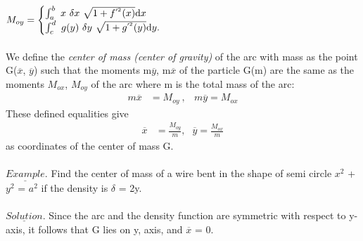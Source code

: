 \documentclass[11pt]{amsbook}
\begin{document}
	\paragraph{}$M_{oy} = \begin{cases} \int_{a}^{b} \ x \ \delta{x} \ \sqrt{1 + f^{'^{2}}(x)}\hDif {x} \\ \int_{c}^{d} \ g(y) \ \delta{y} \ \sqrt{1 + g^{'^{2}}(y)}\hDif {y}. \\ 
	\end{cases}$
	\paragraph{}We define the \textit{center of mass (center of gravity)} of the arc with mass as the point G($\overline{x}$, $\overline{y}$) such that the moments m$\overline{y}$, m$\overline{x}$ of the particle G(m) are the same as the moments $M_{ox}$, $M_{oy}$ of the arc where m is the total mass of the arc:
	\begin{align*}
		m \overline{x} &= M_{oy} \ ,  &m\overline{y}= M_{ox}
	\end{align*}
	These defined equalities give
	\begin{align*}
		  \overline{x} &= \frac{M_{oy}}{m}  \text{,}   &\overline{y} = \frac{M_{ox}}{m}
	\end{align*}
	as coordinates of the center of mass G. 
	\paragraph{}$\underline{Example}$. Find the center of mass of a wire bent in the shape of semi circle $x^{2}$ + $y^{2}$ = $a^{2}$ if the density is $\delta{}$ = 2y. \paragraph{}$\underline{Solution}$. Since the arc and the density function are symmetric with respect to y-axis, it follows that G lies on y, axis, and $\overline{x}$ = 0.
\end{document}
